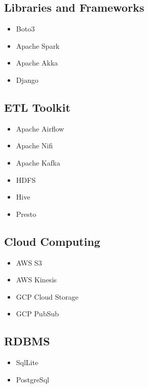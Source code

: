 \documentclass[12pt,a4paper,sans]{moderncv}        %
\begin{document}
\subsection{Libraries and Frameworks}
\begin{multicols}{2}
\begin{itemize}
\item Boto3
\item Apache Spark
\item Apache Akka
\item Django
\end{itemize}
\end{multicols}

\subsection{ETL Toolkit}
\begin{multicols}{2}
\begin{itemize}
\item Apache Airflow
\item Apache Nifi
\item Apache Kafka
\item HDFS
\item Hive
\item Presto
\end{itemize}
\end{multicols}

\newpage
\subsection{Cloud Computing}
\begin{multicols}{2}
\begin{itemize}
\item AWS S3
\item AWS Kinesis
\item GCP Cloud Storage
\item GCP PubSub
\end{itemize}
\end{multicols}

\subsection{RDBMS}
\begin{multicols}{2}
\begin{itemize}
\item SqlLite
\item PostgreSql
\end{itemize}
\end{multicols}
\end{document}
